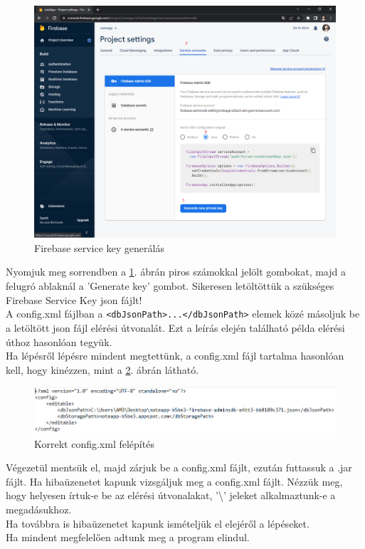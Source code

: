 \begin{figure}[H]
	\centering
	\includegraphics[scale=0.3]{images/config_5.png}
	\caption{Firebase service key generálás}
	\label{fig:firebase_service_key}
\end{figure}
\noindent Nyomjuk meg sorrendben a \ref{fig:firebase_service_key}. ábrán piros számokkal jelölt gombokat, majd a felugró ablaknál a 'Generate key' gombot. Sikeresen letöltöttük a szükséges Firebase Service Key json fájlt!
\vspace{5pt}\\A config.xml fájlban a \texttt{<dbJsonPath>...</dbJsonPath>} elemek közé másoljuk be a letöltött json fájl elérési útvonalát. Ezt a leírás elején található példa elérési úthoz hasonlóan tegyük.
\vspace{5pt}\\ Ha lépésről lépésre mindent megtettünk, a config.xml fájl tartalma hasonlóan kell, hogy kinézzen, mint a \ref{fig:config_file_final}. ábrán látható.
\begin{figure}[h]
	\centering
	\includegraphics[scale=0.5]{images/config_6.png}
	\caption{Korrekt config.xml felépítés}
	\label{fig:config_file_final}
\end{figure}
\newline
\noindent Végezetül mentsük el, majd zárjuk be a config.xml fájlt, ezután futtassuk a .jar fájlt. Ha hibaüzenetet kapunk vizsgáljuk meg a config.xml fájlt. Nézzük meg, hogy helyesen írtuk-e be az elérési útvonalakat, '\textbackslash' jeleket alkalmaztunk-e a megadásukhoz. \\Ha továbbra is hibaüzenetet kapunk ismételjük el elejéről a lépéseket.
\vspace{5pt}\\ Ha mindent megfelelően adtunk meg a program elindul.



